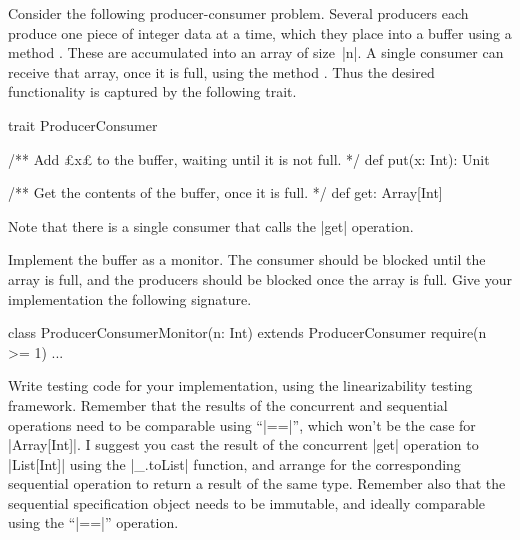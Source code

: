 \begin{questionS}\label{Q:consumerM}
Consider the following producer-consumer problem.  Several producers each
produce one piece of integer data at a time, which they place into a buffer
using a method .  These are accumulated into an array of size~|n|.
A single consumer can receive that array, once it is full, using the method
.  Thus the desired functionality is captured by the following
trait.
%
\begin{scala}
trait ProducerConsumer{
  /** Add £x£ to the buffer, waiting until it is not full. */
  def put(x: Int): Unit

  /** Get the contents of the buffer, once it is full. */
  def get: Array[Int]
}
\end{scala}
%
Note that there is a single consumer that calls the |get| operation. 

Implement the buffer as a monitor.  The consumer should be blocked until the
array is full, and the producers should be blocked once the array is full.
Give your implementation the following signature.
%
\begin{scala}
class ProducerConsumerMonitor(n: Int) extends ProducerConsumer{
  require(n >= 1)
  ...
}
\end{scala}

Write testing code for your implementation, using the linearizability testing
framework.  Remember that the results of the concurrent and sequential
operations need to be comparable using ``|==|'', which won't be the case for
|Array[Int]|.  I suggest you cast the result of the concurrent |get| operation
to |List[Int]| using the |_.toList| function, and arrange for the
corresponding sequential operation to return a result of the same type.
Remember also that the sequential specification object needs to be immutable,
and ideally comparable using the ``|==|'' operation.
\end{questionS}


